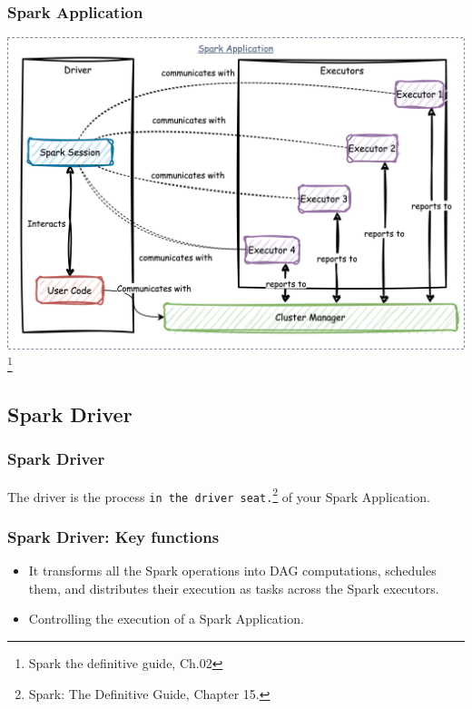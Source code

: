 \begin{frame}
    \frametitle{Spark Application}

    \includegraphics[width=\textwidth,height=.75\textheight,keepaspectratio]{./Figures/chapter-04/SparkCourse.drawio}\footnote{Spark the definitive guide, Ch.02}

\end{frame}

\subsection{Spark Driver}\label{subsec:spark-driver}

\begin{frame}
    \frametitle{Spark Driver}
    The driver is the process \texttt{\color{blue}in the driver seat.}\footnote{Spark: The Definitive Guide, Chapter 15.} of your Spark Application.

\end{frame}

\begin{frame}
    \frametitle{Spark Driver: Key functions}


    \begin{itemize}
        \item It transforms all the Spark operations into DAG computations, schedules them, and distributes their execution as tasks across the Spark executors.
        \item Controlling the execution of a Spark Application.

    \end{itemize}

\end{frame}


